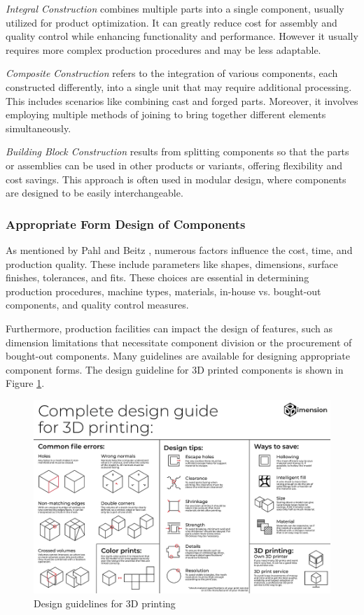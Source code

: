 \textit{Integral Construction} combines multiple parts into a single component, usually utilized for product optimization. It can greatly reduce cost for assembly and quality control while enhancing functionality and performance. However it usually requires more complex production procedures and may be less adaptable.

\textit{Composite Construction} refers to the integration of various components, each constructed differently, into a single unit that may require additional processing. This includes scenarios like combining cast and forged parts. Moreover, it involves employing multiple methods of joining to bring together different elements simultaneously.

\textit{Building Block Construction} results from splitting components so that the parts or assemblies can be used in other products or variants, offering flexibility and cost savings. This approach is often used in modular design, where components are designed to be easily interchangeable.

\subsubsection{Appropriate Form Design of Components}
As mentioned by Pahl and Beitz \cite[362]{Pahl2007}, numerous factors influence the cost, time, and production quality. These include parameters like shapes, dimensions, surface finishes, tolerances, and fits. These choices are essential in determining production procedures, machine types, materials, in-house vs. bought-out components, and quality control measures.

Furthermore, production facilities can impact the design of features, such as dimension limitations that necessitate component division or the procurement of bought-out components. Many guidelines are available for designing appropriate component forms. The design guideline for 3D printed components is shown in Figure \ref{fig:guideline}.

\begin{figure}
    \centering
    \includegraphics[width=0.92\linewidth]{texs/Part1/chapter4/image/guidelines.png}
    \caption{Design guidelines for 3D printing \cite{DDDimension_22}}
    \label{fig:guideline}
\end{figure}

